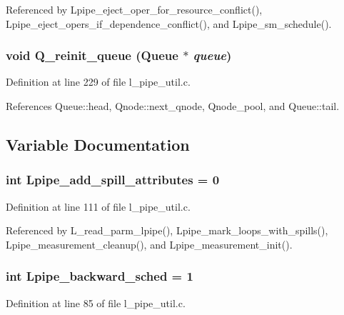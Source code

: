 Referenced by Lpipe\_\-eject\_\-oper\_\-for\_\-resource\_\-conflict(), Lpipe\_\-eject\_\-opers\_\-if\_\-dependence\_\-conflict(), and Lpipe\_\-sm\_\-schedule().
\subsubsection{\setlength{\rightskip}{0pt plus 5cm}void Q\_\-reinit\_\-queue (\bf{Queue} $\ast$ {\em queue})}\label{l__pipe__util_8c_df1c12ac44e95b30e76ae8af8d4b7e4c}




Definition at line 229 of file l\_\-pipe\_\-util.c.

References Queue::head, Qnode::next\_\-qnode, Qnode\_\-pool, and Queue::tail.

\subsection{Variable Documentation}
\subsubsection{\setlength{\rightskip}{0pt plus 5cm}int \bf{Lpipe\_\-add\_\-spill\_\-attributes} = 0}\label{l__pipe__util_8c_e2d1368da174d6c3c8b7ec7d1cbbf44e}




Definition at line 111 of file l\_\-pipe\_\-util.c.

Referenced by L\_\-read\_\-parm\_\-lpipe(), Lpipe\_\-mark\_\-loops\_\-with\_\-spills(), Lpipe\_\-measurement\_\-cleanup(), and Lpipe\_\-measurement\_\-init().
\subsubsection{\setlength{\rightskip}{0pt plus 5cm}int \bf{Lpipe\_\-backward\_\-sched} = 1}\label{l__pipe__util_8c_1ed5180823f3e497dbc3becd928690f5}




Definition at line 85 of file l\_\-pipe\_\-util.c.

